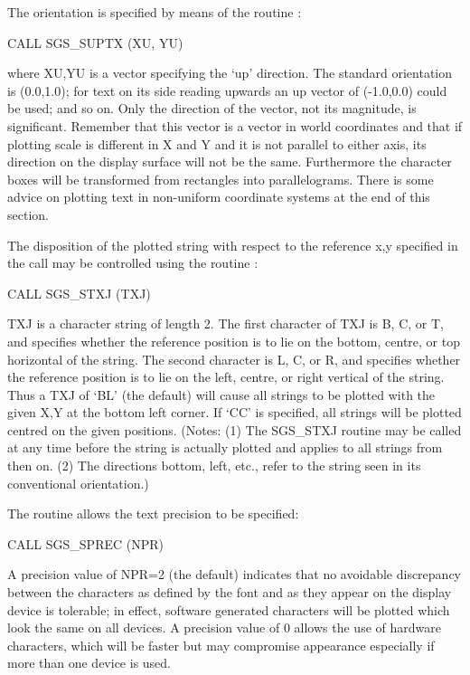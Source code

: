 \documentclass[11pt]{starlink}
\begin{document}
The orientation is specified by means of the routine
:
\begin{terminalv}
CALL SGS_SUPTX (XU, YU)
\end{terminalv}
where XU,YU is a vector specifying the `up'
direction.  The standard orientation is (0.0,1.0);  for
text on its side reading upwards an up vector of (-1.0,0.0) could
be used;  and so on.  Only the direction of the vector, not its
magnitude, is significant.  Remember that this vector is a vector in world
coordinates and that if plotting scale is different in X and Y and it is
not parallel to either axis, its direction on the display surface will not
be the same.  Furthermore the character boxes will be transformed from
rectangles into parallelograms.  There is some advice on plotting text in
non-uniform coordinate systems at the end of this section.

The disposition of the plotted string with respect to
the reference x,y
specified in the 
call may be controlled using the
routine :
\begin{terminalv}
CALL SGS_STXJ (TXJ)
\end{terminalv}
TXJ is a character string of length 2.  The first character of TXJ
is B, C, or T, and specifies whether the reference position is to lie
on the bottom, centre, or top horizontal of the string.  The second
character is L, C, or R, and specifies whether the reference position
is to lie on the left, centre, or right vertical of the string.  Thus
a TXJ of `BL' (the default) will cause all strings to be plotted
with the given X,Y at the bottom left corner.  If `CC' is specified,
all strings will be plotted centred on the given
positions.  (Notes:  (1) The
SGS\_STXJ routine may be called at any time before the string is actually
plotted and applies to all strings from then on.  (2) The directions
bottom, left, etc., refer to the string seen in its conventional
orientation.)

The routine
 allows the text precision to be specified:
\begin{terminalv}
CALL SGS_SPREC (NPR)
\end{terminalv}
A precision value of NPR=2 (the default) indicates that no avoidable
discrepancy between the characters as defined by the font and as
they appear on the display device is tolerable;  in effect, software
generated characters will be plotted which look the same on all
devices.  A precision value of 0 allows the use of hardware
characters, which will be faster but may compromise appearance
especially if more than one device is used.
\end{document}
